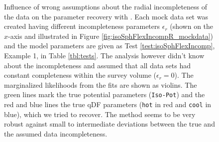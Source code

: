 
\begin{figure}
\centering
{}
\caption{Influence of wrong assumptions about the radial incompleteness of the data on the parameter recovery with \RM{}. Each mock data set was created having different incompleteness parameters $\epsilon_r$ (shown on the $x$-axis and illustrated in Figure \ref{fig:isoSphFlexIncompR_mockdata}) and the model parameters are given as Test \ref{test:isoSphFlexIncomp}, Example 1, in Table \ref{tbl:tests}. The analysis however didn't know about the incompleteness and assumed that all data sets had constant completeness within the survey volume ($\epsilon_r = 0$). The marginalized likelihoods from the fits are shown as violins. The green lines mark the true potential parameters (\texttt{Iso-Pot}) and the red and blue lines the true qDF parameters (\texttt{hot} \MAP in red and \texttt{cool} \MAP in blue), which we tried to recover. The \RM{} method seems to be very robust against small to intermediate deviations between the true and the assumed data incompleteness.} 
\label{fig:isoSphFlexIncompR_violins}
\end{figure}
